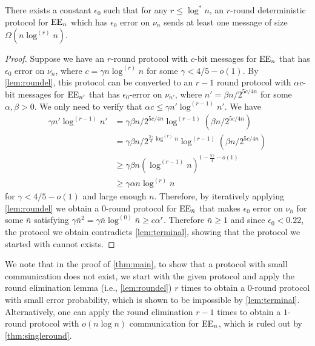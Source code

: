\begin{theorem}
\label{thm:main2}
There exists a constant $\epsilon_0$ such that for any $r\leq\log^*n$,
an $r$-round deterministic protocol for $\operatorname{EE}_n$ which has
$\epsilon_0$ error on $\nu_n$ sends at least one message of size 
$\Omega(n\log^{(r)}n)$.
\end{theorem}
\begin{proof}
Suppose we have an $r$-round protocol with $c$-bit messages for
$\operatorname{EE}_n$ that has $\epsilon_0$ error on $\nu_n$, where $c=\gamma
n\log^{(r)}n$ for some $\gamma<4/5-o(1)$. By
\autoref{lem:roundel}, this protocol can be converted to an
$r-1$ round protocol with $\alpha c$-bit messages for $\operatorname{EE}_{n'}$
that has $\epsilon_0$-error on $\nu_{n'}$, where $n'=\beta
n/2^{5c/4n}$ for some $\alpha, \beta >0$. We only need to verify
that $\alpha c \leq \gamma n'\log^{(r-1)}n'$. We have
\begin{align*}
\gamma n'\log^{(r-1)} n' &= \gamma\beta n/2^{5c/4n}\log^{(r-1)}
(\beta n/2^{5c/4n})\\
&= \gamma\beta n/2^{\frac{5\gamma}{4}\log^{(r)}n}\log^{(r-1)}
(\beta n/2^{5c/4n})\\
&\geq \gamma\beta n \left(\log^{(r-1)}n\right)^{1-\frac{5\gamma}{4}-o(1)}\\
&\geq \gamma\alpha n\log^{(r)}n
\end{align*}
for $\gamma< 4/5 - o(1)$ and large enough $n$. Therefore, by
iteratively applying \autoref{lem:roundel} we obtain a $0$-round
protocol for $\operatorname{EE}_{\bar n}$ that makes $\epsilon_0$ error on
$\nu_{\bar n}$ for some $\bar n$ satisfying $\gamma {\bar n}^2 =
\gamma \bar n \log^{(0)} \bar n\geq c \alpha^r$. Therefore $\bar
n \geq 1$ and since $\epsilon_0< 0.22$, the protocol we obtain
contradicts \autoref{lem:terminal}, showing that the protocol we
started with cannot exists.
\end{proof}
\begin{remark}
We note that in the proof of \autoref{thm:main}, to show that a
protocol with small communication does not exist, we start with
the given protocol and apply the round elimination lemma (i.e.,
\autoref{lem:roundel}) $r$ times to obtain a $0$-round protocol
with small error probability, which is shown to be impossible by
\autoref{lem:terminal}. Alternatively, one can apply the round
elimination $r-1$ times to obtain a $1$-round protocol with
$o(n\log n)$ communication for $\operatorname{EE}_{n}$, which is ruled out by
\autoref{thm:singleround}.
\end{remark}
